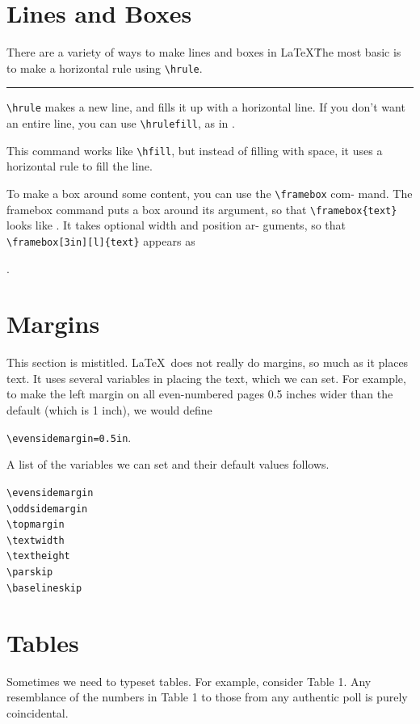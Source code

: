 \documentclass[12pt]{article}
\begin{document}
\section{Lines and Boxes}
	
	There are a variety of ways to make lines and boxes in \LaTeX\. The most
	basic is to make a horizontal rule using \verb|\hrule|.\hrule
	\newpage
	
	\verb|\hrule| makes a new line, and fills it up with a horizontal line. If you
	don’t want an entire line, you can use \verb|\hrulefill|, as in \hrulefill
	.
	
	\noindent This command works like \verb|\hfill|, but instead of filling with space, it uses a
	horizontal rule to fill the line.
	
	To make a box around some content, you can use the \verb|\framebox| com-
	mand. The framebox command puts a box around its argument, so that
	\verb|\framebox{text}| looks like  . It takes optional width and position ar-
	guments, so that \verb|\framebox[3in][l]{text}| appears as
	
	\noindent {}
	.
	
\section{Margins}

This section is mistitled. \LaTeX\ does not really do margins, so much as it
places text. It uses several variables in placing the text, which we can set.
For example, to make the left margin on all even-numbered pages 0.5 inches
wider than the default (which is 1 inch), we would define

\noindent \verb|\evensidemargin=0.5in|.

\noindent A list of the variables we can set and their default values follows.

\noindent
\verb|\evensidemargin|\\
\verb|\oddsidemargin|\\
\verb|\topmargin|\\
\verb|\textwidth|\\
\verb|\textheight|\\
\verb|\parskip|\\
\verb|\baselineskip|


\section{Tables}
Sometimes we need to typeset tables. For example, consider Table 1. Any
resemblance of the numbers in Table 1 to those from any authentic poll is
purely coincidental.
\end{document}
